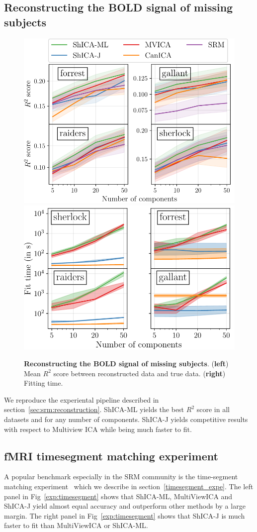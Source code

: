 \subsection{Reconstructing the BOLD signal of missing subjects}
\begin{figure}
  \centering
  \includegraphics[width=0.49\linewidth]{./figures/amvica/reconstruction.pdf}
  \includegraphics[width=0.49\linewidth]{./figures/amvica/reconstruction_timings.pdf}
  
  \caption{\textbf{Reconstructing the BOLD signal of
      missing subjects}. (\textbf{left}) Mean $R^2$ score between reconstructed data and true
    data. (\textbf{right}) Fitting time.
    }
  \label{fig:reconstruction}
\end{figure}

We reproduce the experiental pipeline described in section~\ref{sec:srm:reconstruction}.
ShICA-ML yields the best $R^2$ score in all datasets and for any number of
components. ShICA-J yields competitive results with respect to Multiview ICA
while being much faster to fit.


\subsection{fMRI timesegment matching experiment}
A popular benchmark especially in the SRM community is the time-segment matching
experiment~\cite{chen2015reduced} which we describe in
section~\ref{timesegment_expe}.
The left panel in Fig~\ref{exp:timesegment} shows that ShICA-ML, MultiViewICA and ShICA-J yield almost equal accuracy and outperform other methods by a large margin. The right panel in Fig~\ref{exp:timesegment} shows that ShICA-J is much faster to fit than MultiViewICA or ShICA-ML.


